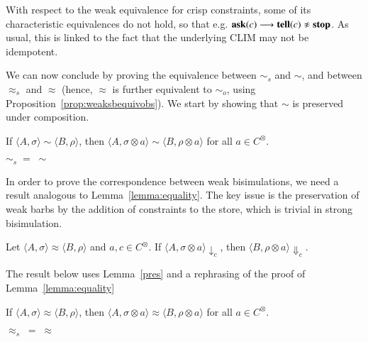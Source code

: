 \documentclass[main.tex]{subfiles}
\begin{document}
With respect to the weak equivalence for crisp constraints, some of its characteristic equivalences do not hold, so that e.g.
${\bf ask}(c) \longrightarrow {\bf tell}({c}) \not  \approx {\bf stop}$. As usual, this is linked to the fact that the underlying CLIM may not be idempotent.

We can now conclude by proving the equivalence between $\sim_{\mathit{s}}$ and $\sim$, and between $\approx_{\mathit{s}}$ and $\approx$ (hence, $\approx$ is further equivalent to $\sim_o$, using Proposition~\ref{prop:weaksbequivobs}). We start by showing that $\sim$ is preserved under composition.

\begin{lemma}\label{lemma:equality}
If $\langle A, \sigma\rangle \sim \langle B, \rho\rangle$, then $\langle A, \sigma \otimes a \rangle \sim \langle B, \rho \otimes a\rangle$ for all $a \in C^\otimes$.
\end{lemma}

\begin{theorem}\label{stronEq}
$\sim_{\mathit{s}} \; = \; \sim$
\end{theorem}

In order to prove the correspondence between weak bisimulations, we need a result 
analogous to Lemma~\ref{lemma:equality}. The key issue is the preservation of weak barbs by
the addition of constraints to the store, which is  trivial in strong bisimulation.

\begin{lemma}\label{pres}
Let $\langle A, \sigma \rangle \approx \langle B, \rho \rangle$ and $a, c \in C^\otimes$. If $\langle A, \sigma \otimes a \rangle\downarrow_c$, then $\langle B, \rho \otimes a\rangle\Downarrow_c$.
\end{lemma}

The result below uses Lemma~\ref{pres} and a rephrasing of the proof of Lemma~\ref{lemma:equality}

\begin{lemma}
If $\langle A, \sigma \rangle \approx \langle B, \rho \rangle$, then $\langle A, \sigma \otimes a \rangle \approx \langle B, \rho \otimes a \rangle$ for all $a \in C^\otimes$.
\end{lemma}

\begin{theorem}
\label{th:wbisimiffwsbbisim}
$\approx_{\mathit{s}} \; = \; \approx$
\end{theorem}


\end{document}
